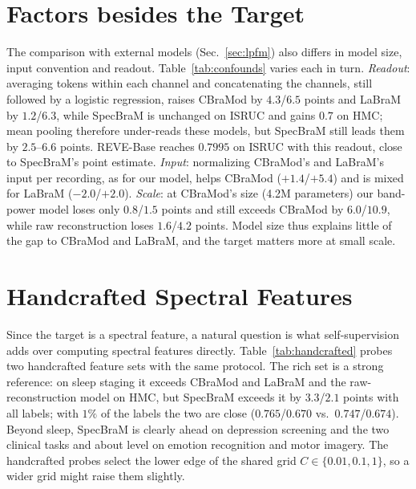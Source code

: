 \section{Factors besides the Target}\label{app:confounds}

The comparison with external models (Sec.~\ref{sec:lpfm}) also differs in model size, input
convention and readout. Table~\ref{tab:confounds} varies each in turn. \emph{Readout}: averaging
tokens within each channel and concatenating the channels, still followed by a logistic
regression, raises CBraMod by $4.3$/$6.5$ points and LaBraM by $1.2$/$6.3$, while SpecBraM is
unchanged on ISRUC and gains $0.7$ on HMC; mean pooling therefore under-reads these models, but
SpecBraM still leads them by $2.5$--$6.6$ points. REVE-Base reaches $0.7995$ on ISRUC with this
readout, close to SpecBraM's point estimate. \emph{Input}: normalizing CBraMod's and LaBraM's input per
recording, as for our model, helps CBraMod ($+1.4$/$+5.4$) and is mixed for LaBraM
($-2.0$/$+2.0$). \emph{Scale}: at CBraMod's size (4.2M parameters) our band-power model loses
only $0.8$/$1.5$ points and still exceeds CBraMod by $6.0$/$10.9$, while raw reconstruction
loses $1.6$/$4.2$ points. Model size thus explains little of the gap to CBraMod and LaBraM, and
the target matters more at small scale.

\section{Handcrafted Spectral Features}\label{app:handcrafted}

Since the target is a spectral feature, a natural question is what self-supervision adds over
computing spectral features directly. Table~\ref{tab:handcrafted} probes two handcrafted feature
sets with the same protocol. The rich set is a strong reference: on sleep staging it exceeds
CBraMod and LaBraM and the raw-reconstruction model on HMC, but SpecBraM exceeds it by
$3.3$/$2.1$ points with all labels; with $1\%$ of the labels the two are close
($0.765$/$0.670$ vs.\ $0.747$/$0.674$). Beyond sleep, SpecBraM is clearly ahead on depression
screening and the two clinical tasks and about level on emotion recognition and motor imagery.
The handcrafted probes select the lower edge of the shared grid $C\in\{0.01,0.1,1\}$, so a
wider grid might raise them slightly.
